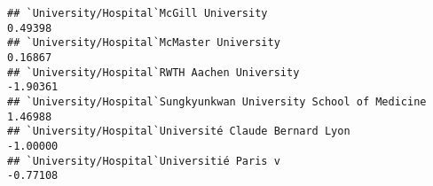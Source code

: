 \documentclass[]{article}
\begin{document}
\begin{verbatim}
## `University/Hospital`McGill University                                                                                                                                                                                                                                                                                                                                                                                                                                           0.49398
## `University/Hospital`McMaster University                                                                                                                                                                                                                                                                                                                                                                                                                                         0.16867
## `University/Hospital`RWTH Aachen University                                                                                                                                                                                                                                                                                                                                                                                                                                     -1.90361
## `University/Hospital`Sungkyunkwan University School of Medicine                                                                                                                                                                                                                                                                                                                                                                                                                  1.46988
## `University/Hospital`Université Claude Bernard Lyon                                                                                                                                                                                                                                                                                                                                                                                                                             -1.00000
## `University/Hospital`Universitié Paris v                                                                                                                                                                                                                                                                                                                                                                                                                                        -0.77108

\end{verbatim}
\end{document}
